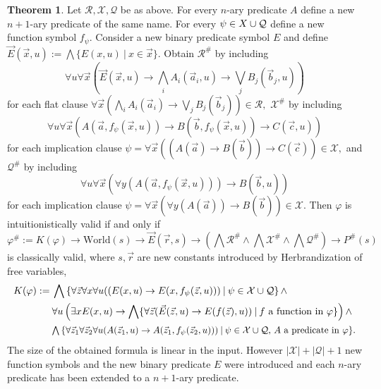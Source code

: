 \documentclass{easychair}
\theoremstyle{definition}
\newtheorem{theorem}{Theorem}[section]
\theoremstyle{definition}
\theoremstyle{definition}
\theoremstyle{definition}
\theoremstyle{definition}
\theoremstyle{definition}
\theoremstyle{definition}
\begin{document}
\begin{theorem}\label{thm:fo-translation}
	Let $\mathcal R,\mathcal X,\mathcal Q$ be as above. For every $n$-ary predicate $A$ define a new $n+1$-ary predicate of the same name. For every $\psi\in\mathcal \mathcal X\cup\mathcal Q$ define a new function symbol $f_\psi$. Consider a new binary predicate symbol $E$ and define $\vec E(\vec x, u) := \bigwedge\{E(x, u)\:|\:x\in\vec x\}$. Obtain $\mathcal R^\#$ by including
	$$
		\forall u\forall \vec x\left(\vec E(\vec x, u)\to\bigwedge_i A_i(\vec a_i, u)\to\bigvee_j B_j(\vec b_j, u)\right)
	$$
 	for each flat clause
 	$
 		\forall \vec x\left(\bigwedge_i A_i(\vec a_i)\to\bigvee_j B_j(\vec b_j)\right)\in\mathcal R,
 	$
 	$\mathcal X^\#$ by including
 	$$
 		\forall u\forall \vec x\left(A(\vec a, f_\psi(\vec x, u))\to B(\vec b, f_\psi(\vec x, u))\to C(\vec c, u)\right)
 	$$
 	for each implication clause
	$
		\psi = \forall \vec x\left(\left(A(\vec a)\to B(\vec b)\right)\to C(\vec c)\right)\in\mathcal X,
	$
	and $\mathcal Q^\#$ by including
	$$
		\forall u\forall \vec x\left(\forall y\left(A(\vec a, f_\psi(\vec x, u))\right)\to B(\vec b, u)\right)
	$$
	for each implication clause
	$
		\psi = \forall \vec x\left(\forall y\left(A(\vec a)\right)\to B(\vec b)\right)\in\mathcal X.
	$
	Then $\varphi$ is intuitionistically valid if and only if
	$$
		\varphi^\# := K(\varphi)\to\text{World}(s)\to\vec E(\vec r, s) \to \left(\bigwedge\mathcal R^\#\wedge\bigwedge\mathcal X^\#\wedge\bigwedge\mathcal Q^\#\right)\to P^\#(s)
	$$
	is classically valid, where $s, \vec r$ are new constants introduced by Herbrandization of free variables,
	\begin{align*}
		K(\varphi) := &\:\bigwedge\left\{\forall\vec z\forall x\forall u((E(x, u)\to E(x, f_\psi(\vec z, u)))\:|\:\psi\in\mathcal X\cup\mathcal Q\right\}\wedge\\
		&\:\forall u\left(\exists xE(x, u)\to \bigwedge\{\forall\vec z(\vec E(\vec z, u)\to E(f(\vec z), u))\:|\:\text{$f$ a function in $\varphi$}\}\right)\wedge\\
		&\resizebox{.9\hsize}{!}{$\:\bigwedge\left\{\forall\vec z_1\forall \vec z_2\forall u(A(\vec z_1, u)\to A(\vec z_1, f_\psi(\vec z_2, u)))\:|\:\text{$\psi\in\mathcal X\cup\mathcal Q$, $A$ a predicate in $\varphi$}\right\}$.}
	\end{align*}
	The size of the obtained formula is linear in the input. However $|\mathcal X| + |\mathcal Q| + 1$ new function symbols and the new binary predicate $E$ were introduced and each $n$-ary predicate has been extended to a $n+1$-ary predicate.
\end{theorem}
\end{document}
